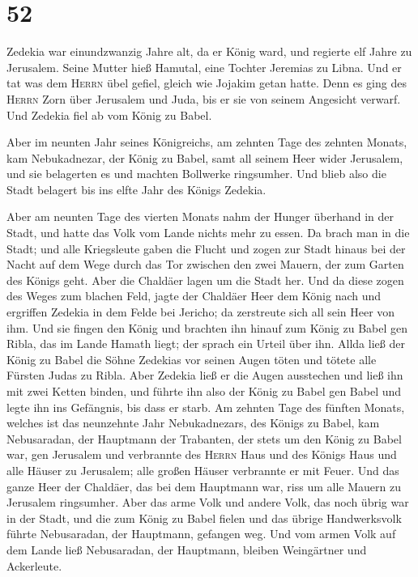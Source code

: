 \hypertarget{section-51}{%
\section{52}\label{section-51}}

 Zedekia war einundzwanzig Jahre alt, da er König ward,
und regierte elf Jahre zu Jerusalem. Seine Mutter hieß Hamutal, eine
Tochter Jeremias zu Libna.  Und er tat was dem
\textsc{Herrn} übel gefiel, gleich wie Jojakim getan hatte.
 Denn es ging des \textsc{Herrn} Zorn über Jerusalem und
Juda, bis er sie von seinem Angesicht verwarf. Und Zedekia fiel ab vom
König zu Babel.

 Aber im neunten Jahr seines Königreichs, am zehnten Tage
des zehnten Monats, kam Nebukadnezar, der König zu Babel, samt all
seinem Heer wider Jerusalem, und sie belagerten es und machten Bollwerke
ringsumher.  Und blieb also die Stadt belagert bis ins
elfte Jahr des Königs Zedekia.

 Aber am neunten Tage des vierten Monats nahm der Hunger
überhand in der Stadt, und hatte das Volk vom Lande nichts mehr zu
essen.  Da brach man in die Stadt; und alle Kriegsleute
gaben die Flucht und zogen zur Stadt hinaus bei der Nacht auf dem Wege
durch das Tor zwischen den zwei Mauern, der zum Garten des Königs geht.
Aber die Chaldäer lagen um die Stadt her.  Und da diese
zogen des Weges zum blachen Feld, jagte der Chaldäer Heer dem König nach
und ergriffen Zedekia in dem Felde bei Jericho; da zerstreute sich all
sein Heer von ihm.  Und sie fingen den König und brachten
ihn hinauf zum König zu Babel gen Ribla, das im Lande Hamath liegt; der
sprach ein Urteil über ihn.  Allda ließ der König zu
Babel die Söhne Zedekias vor seinen Augen töten und tötete alle Fürsten
Judas zu Ribla.  Aber Zedekia ließ er die Augen
ausstechen und ließ ihn mit zwei Ketten binden, und führte ihn also der
König zu Babel gen Babel und legte ihn ins Gefängnis, bis dass er starb.
 Am zehnten Tage des fünften Monats, welches ist das
neunzehnte Jahr Nebukadnezars, des Königs zu Babel, kam Nebusaradan, der
Hauptmann der Trabanten, der stets um den König zu Babel war, gen
Jerusalem  und verbrannte des \textsc{Herrn} Haus und des
Königs Haus und alle Häuser zu Jerusalem; alle großen Häuser verbrannte
er mit Feuer.  Und das ganze Heer der Chaldäer, das bei
dem Hauptmann war, riss um alle Mauern zu Jerusalem ringsumher.
 Aber das arme Volk und andere Volk, das noch übrig war
in der Stadt, und die zum König zu Babel fielen und das übrige
Handwerksvolk führte Nebusaradan, der Hauptmann, gefangen weg.
 Und vom armen Volk auf dem Lande ließ Nebusaradan, der
Hauptmann, bleiben Weingärtner und Ackerleute.

